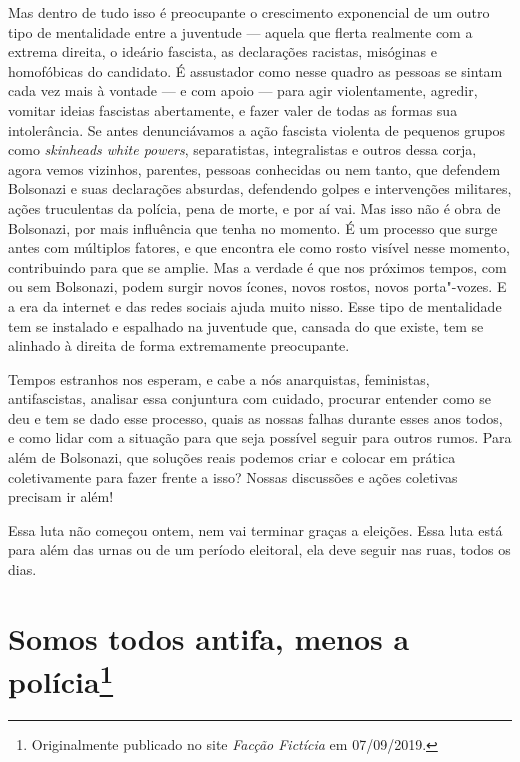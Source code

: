 Mas dentro de tudo isso é preocupante o crescimento exponencial de um outro tipo de mentalidade entre a juventude --- aquela que flerta realmente com a extrema direita, o ideário fascista, as declarações racistas, misóginas e homofóbicas do candidato. É assustador como nesse quadro as pessoas se sintam cada vez mais à vontade --- e com apoio --- para agir violentamente, agredir, vomitar ideias fascistas abertamente, e fazer valer de todas as formas sua intolerância. Se antes denunciávamos a ação fascista violenta de pequenos grupos como \emph{skinheads white powers}, separatistas, integralistas e outros dessa corja, agora vemos vizinhos, parentes, pessoas conhecidas ou nem tanto, que defendem Bolsonazi e suas declarações absurdas, defendendo golpes e intervenções militares, ações truculentas da polícia, pena de morte, e por aí vai. Mas isso não é obra de Bolsonazi, por mais influência que tenha no momento. É um processo que surge antes com múltiplos fatores, e que encontra ele como rosto visível nesse momento, contribuindo para que se amplie. Mas a verdade é que nos próximos tempos, com ou sem Bolsonazi, podem surgir novos ícones, novos rostos, novos porta"-vozes. E a era da internet e das redes sociais ajuda muito nisso. Esse tipo de mentalidade tem se instalado e espalhado na juventude que, cansada do que existe, tem se alinhado à direita de forma extremamente preocupante.

Tempos estranhos nos esperam, e cabe a nós anarquistas, feministas, antifascistas, analisar essa conjuntura com cuidado, procurar entender como se deu e tem se dado esse processo, quais as nossas falhas durante esses anos todos, e como lidar com a situação para que seja possível seguir para outros rumos. Para além de Bolsonazi, que soluções reais podemos criar e colocar em prática coletivamente para fazer frente a isso? Nossas discussões e ações coletivas precisam ir além!

Essa luta não começou ontem, nem vai terminar graças a eleições. Essa luta está para além das urnas ou de um período eleitoral, ela deve seguir nas ruas, todos os dias.

\chapter*{Somos todos antifa, menos a polícia\footnote[*]{Originalmente publicado no site \emph{Facção Fictícia} em 07/09/2019.}}

